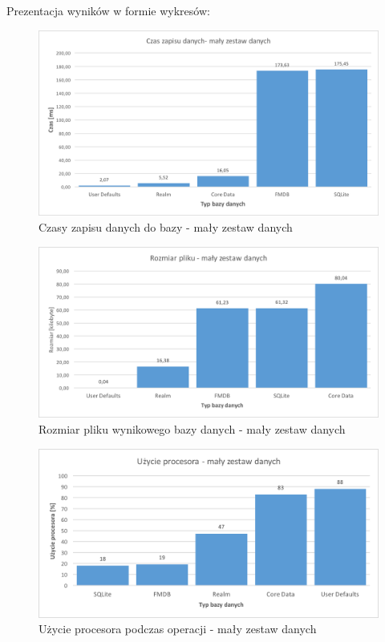 \newpage
Prezentacja wyników w formie wykresów: 

\begin{figure}[h]
\centering
	\includegraphics[width=15cm]{img/save_data/save_speed_small.png}
	\caption{Czasy zapisu danych do bazy - mały zestaw danych}
	\label{fig: small-save-time}
\end{figure}

\begin{figure}[h]
\centering
	\includegraphics[width=15cm]{img/save_data/save_file_small.png}
	\caption{Rozmiar pliku wynikowego bazy danych - mały zestaw danych}
	\label{fig: small-save-file-size}
\end{figure}

\newpage

\begin{figure}[h]
\centering
	\includegraphics[width=15cm]{img/save_data/save_cpu_small.png}
	\caption{Użycie procesora podczas operacji - mały zestaw danych}
	\label{fig: small-save-cpu}
\end{figure}

